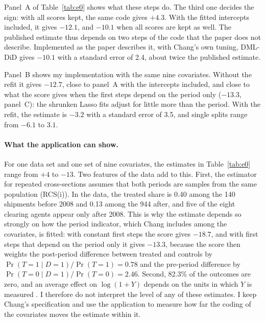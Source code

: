 \documentclass[11pt]{article}
\newenvironment{ins}{\begin{leftbar}}{\end{leftbar}}
\theoremstyle{plain}
\theoremstyle{remark}
\begin{document}
\begin{ins}
Panel~A of Table~\ref{tab:e0} shows what these steps do. The third one decides
the sign: with all scores kept, the same code gives $+4.3$. With the fitted
intercepts included, it gives $-12.1$, and $-10.1$ when all scores are kept as
well. The published estimate thus depends on two steps of the code that the
paper does not describe. Implemented as the paper describes it, with Chang's own
tuning, DML-DiD gives $-10.1$ with a standard error of 2.4, about twice the
published estimate.

Panel~B shows my implementation with the same nine covariates. Without the
refit it gives $-12.7$, close to panel~A with the intercepts included, and
close to what the score gives when the first steps depend on the period only
($-13.3$, panel~C): the shrunken Lasso fits adjust for little more than the
period. With the refit, the estimate is $-3.2$ with a standard error of 3.5, and
single splits range from $-6.1$ to $3.1$.

\paragraph{What the application can show.} For one data set and one set of nine
covariates, the estimates in Table~\ref{tab:e0} range from $+4$ to $-13$. Two
features of the data add to this. First, the estimator for repeated
cross-sections assumes that both periods are samples from the same population
(RCS(i)). In the data, the treated share is 0.40 among the 140 shipments before
2008 and 0.13 among the 944 after, and five of the eight clearing agents appear
only after 2008. This is why the estimate depends so strongly on how the period
indicator, which Chang includes among the covariates, is fitted: with constant
first steps the score gives $-18.7$, and with first steps that depend on the
period only it gives $-13.3$, because the score then weights the post-period
difference between treated and controls by $\Pr(T=1\mid D=1)/\Pr(T=1)=0.78$ and
the pre-period difference by $\Pr(T=0\mid D=1)/\Pr(T=0)=2.46$. Second, 82.3\% of
the outcomes are zero, and an average effect on $\log(1+Y)$ depends on the units
in which $Y$ is measured \parencite{chen2024logs}. I therefore do not interpret
the level of any of these estimates. I keep Chang's specification and use the
application to measure how far the coding of the covariates moves the estimate
within it.
\end{ins}
\end{document}
